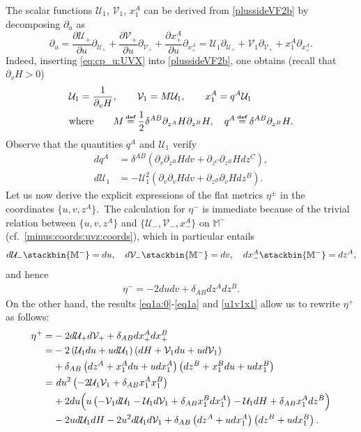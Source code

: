 \documentclass[11pt]{article}
\numberwithin{equation}{section}
\def\Mkm{\mathbb{M}^-}
\def\flatp{\eta^+}
\def\flatm{\eta^-}
\def\flatpm{\eta^{\pm}}
\def\qfunction{q}
\def\defi{{\stackrel{\mbox{\tiny {\textbf{def}}}}{\,\, = \,\, }}}
\newcommand{\nn}{\nonumber}
\def\defi{{\stackrel{\mbox{\tiny \textup{\textbf{def}}}}{\,\, = \,\, }}}
\newcommand{\cp}{\partial}
\newcommand{\lp}{\left(}
\newcommand{\rp}{\right)}
\newcommand{\cu}{\mathcal{U}}
\newcommand{\cv}{\mathcal{V}}
\newcommand{\spc}{\textup{ }}
\begin{document}
The scalar functions $\cu_1$, $\cv_1$, $x^A_1$ can be derived from \eqref{plussideVF2b} by decomposing $\cp_u$ as
\begin{equation}
\label{eq:cp_u:UVX}\cp_u=\frac{\cp \cu_+}{\cp u}\cp_{\cu_+}+\frac{\cp \cv_+}{\cp u}\cp_{\cv_+}+\frac{\cp x^A_+}{\cp u}\cp_{x^A_+}=\cu_1\cp_{\cu_+}+\cv_1\cp_{\cv_+}+x_1^A\cp_{x^A_+}.
\end{equation}
Indeed, inserting \eqref{eq:cp_u:UVX} into \eqref{plussideVF2b}, one obtains (recall that $\cp_vH>0$)
\begin{align}
\label{u1v1x1}&\cu_1=\dfrac{1}{\cp_vH},\qquad\cv_1=M\cu_1,\qquad x^A_1=\qfunction^A\cu_1\\
\nn &\textup{where}\qquad M\defi \dfrac{1}{2}\delta^{AB}\cp_{z^A}H\cp_{z^B}H,\quad\qfunction^A\defi \delta^{AB}\cp_{z^B}H.
\end{align}
Observe that the quantities $\qfunction^A$ and $\cu_1$ verify
\begin{align}
\label{id:for:dqA:and:dU1:a} d\qfunction^A&=\delta^{AB}\lp \cp_{v}\cp_{z^B}Hdv+\cp_{z^C}\cp_{z^B}Hdz^C\rp,\\
\label{id:for:dqA:and:dU1:b} d\cu_1&=-\cu_1^2\lp \cp_{v}\cp_{v}Hdv+\cp_{z^B}\cp_{v}Hdz^B\rp.
\end{align}
Let us now derive the explicit expressions of the flat metrics $\flatpm$ in the coordinates $\{u,v,z^A\}$.\ The calculation for $\flatm$ is immediate because of the trivial relation between $\{u,v,z^A\}$ and $\{\cu_-,\cv_-,x^A_-\}$ on $\Mkm$ (cf.\ \eqref{minus:coords:uvz:coords}), which in particular entails
\begin{align}
\label{one-forms:minus:side}d\cu_-\stackbin{\Mkm}= du,\quad d\cv_-\stackbin{\Mkm}=dv,\quad dx_-^A\stackbin{\Mkm}=dz^A,
\end{align} 
and hence 
\begin{align}
\label{flatm:uvz}\flatm=-2dudv+\delta_{AB}dz^Adz^B.
\end{align}
On the other hand, the results \eqref{eq1a:0}-\eqref{eq1a} and \eqref{u1v1x1} allow us to rewrite $\flatp$ as follows:\ 
\begin{align}
\nonumber \flatp=&-2d\cu_+d\cv_++\delta_{AB}dx_+^Adx_+^B\\
\nonumber =&-2\lp \cu_1du+ud\cu_1\rp \lp dH+\cv_1du+ud\cv_1\rp\\
\nonumber &+\delta_{AB}\lp dz^A+ x^A_1du+u dx^A_1\rp \lp dz^B+ x^B_1du+u dx^B_1\rp\\
\nonumber =&\spc du^2\lp -2\cu_1\cv_1+\delta_{AB}x^A_1x^B_1\rp\\
\nonumber &+2du\Big( u\lp -\cv_1d\cu_1-\cu_1d\cv_1+\delta_{AB}x_1^Bdx_1^A\rp-\cu_1dH+\delta_{AB}x_1^Adz^B\Big)\\
\label{mas:Eqs:yoyanosequeponer} &-2ud\cu_1dH-2u^2d\cu_1d\cv_1+\delta_{AB}\lp dz^A+udx_1^A\rp \lp  dz^B+udx_1^B\rp.
\end{align}
\end{document}
